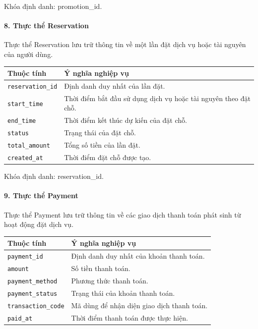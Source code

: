 Khóa định danh: promotion\_id.

\paragraph{8. Thực thể Reservation}\mbox{}\par

Thực thể Reservation lưu trữ thông tin về một lần đặt dịch vụ hoặc tài nguyên của người dùng.

\begin{center}
\scriptsize
\begin{tabular}{p{.25\linewidth} p{.65\linewidth}}
\toprule
Thuộc tính & Ý nghĩa nghiệp vụ \\
\midrule
\texttt{reservation\_id} & Định danh duy nhất của lần đặt. \\
\texttt{start\_time} & Thời điểm bắt đầu sử dụng dịch vụ hoặc tài nguyên theo đặt chỗ. \\
\texttt{end\_time} & Thời điểm kết thúc dự kiến của đặt chỗ. \\
\texttt{status} & Trạng thái của đặt chỗ. \\
\texttt{total\_amount} & Tổng số tiền của lần đặt. \\
\texttt{created\_at} & Thời điểm đặt chỗ được tạo. \\
\bottomrule
\end{tabular}
\end{center}

Khóa định danh: reservation\_id.

\paragraph{9. Thực thể Payment}\mbox{}\par

Thực thể Payment lưu trữ thông tin về các giao dịch thanh toán phát sinh từ hoạt động đặt dịch vụ.

\begin{center}
\scriptsize
\begin{tabular}{p{.25\linewidth} p{.65\linewidth}}
\toprule
Thuộc tính & Ý nghĩa nghiệp vụ \\
\midrule
\texttt{payment\_id} & Định danh duy nhất của khoản thanh toán. \\
\texttt{amount} & Số tiền thanh toán. \\
\texttt{payment\_method} & Phương thức thanh toán. \\
\texttt{payment\_status} & Trạng thái của khoản thanh toán. \\
\texttt{transaction\_code} & Mã dùng để nhận diện giao dịch thanh toán. \\
\texttt{paid\_at} & Thời điểm thanh toán được thực hiện. \\
\bottomrule
\end{tabular}
\end{center}

